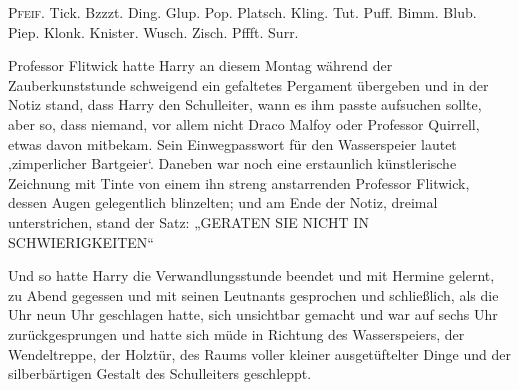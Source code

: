 

\lettrine{P}{feif.} Tick. Bzzzt. Ding. Glup. Pop. Platsch. Kling. Tut. Puff. Bimm. Blub. Piep. Klonk. Knister. Wusch. Zisch. Pffft. Surr.

Professor Flitwick hatte Harry an diesem Montag während der Zauberkunststunde schweigend ein gefaltetes Pergament übergeben und in der Notiz stand, dass Harry den Schulleiter, wann es ihm passte aufsuchen sollte, aber so, dass niemand, vor allem nicht Draco Malfoy oder Professor Quirrell, etwas davon mitbekam. Sein Einwegpasswort für den Wasserspeier lautet ‚zimperlicher Bartgeier‘.%
Daneben war noch eine erstaunlich künstlerische Zeichnung mit Tinte von einem ihn streng anstarrenden Professor Flitwick, dessen Augen gelegentlich blinzelten; und am Ende der Notiz, dreimal unterstrichen, stand der Satz:
„GERATEN SIE NICHT IN SCHWIERIGKEITEN“

Und so hatte Harry die Verwandlungsstunde beendet und mit Hermine gelernt, zu Abend gegessen und mit seinen Leutnants gesprochen und schließlich, als die Uhr neun Uhr geschlagen hatte, sich unsichtbar gemacht und war auf sechs Uhr zurückgesprungen und hatte sich müde in Richtung des Wasserspeiers, der Wendeltreppe, der Holztür, des Raums voller kleiner ausgetüftelter Dinge und der silberbärtigen Gestalt des Schulleiters geschleppt.


